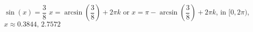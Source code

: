  {$\sin(x) = \dfrac{3}{8}$}
{ $x = \arcsin\left(\dfrac{3}{8}\right) + 2\pi k$ or $x = \pi - \arcsin\left(\dfrac{3}{8}\right) + 2\pi k$, in  $[0, 2\pi)$, $x \approx 0.3844, \, 2.7572$}
